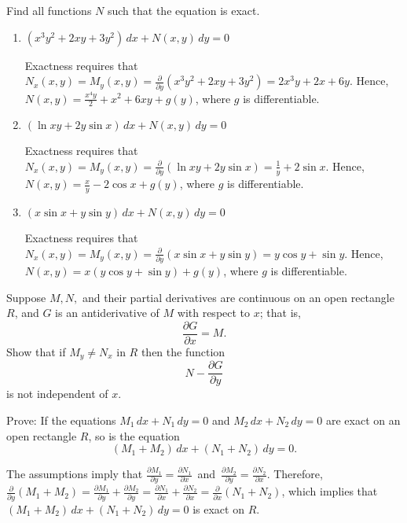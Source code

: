 \documentclass{ximera}
\begin{document}
\begin{problem}\label{exer:2.5.30}
Find all functions $N$ such that the  equation is exact.
\begin{enumerate}
\item %
$(x^3y^2+2xy+3y^2)\,dx+N(x,y)\,dy=0$



\begin{solution}
    Exactness requires that
$N_x(x,y)=M_y(x,y)=\frac{\partial}{\partial
y}(x^3y^2+2xy+3y^2)=2x^3y+2x+6y$.
 Hence, $N(x,y)=\frac{x^4y}{2}+x^2+6xy+g(y)$,
where $g$ is  differentiable.
\end{solution}

\item %
$(\ln xy+2y\sin x)\,dx+N(x,y)\,dy=0$



\begin{solution}
    Exactness requires that
$N_x(x,y)=M_y(x,y)=\frac{\partial}{\partial y}(\ln xy+2y\sin
x)=\frac{1}{y}+2\sin x$.
 Hence, $N(x,y)=\frac{x}{y}-2\cos x+g(y)$,
where $g$ is  differentiable.
\end{solution}
\item %
$(x\sin x+y\sin y)\,dx+N(x,y)\,dy=0$



\begin{solution}
    Exactness requires that
$N_x(x,y)=M_y(x,y)=\frac{\partial}{\partial y}(x\sin x+y\sin
y)=y\cos y+\sin y$.
 Hence, $N(x,y)=x(y\cos y+\sin y)+g(y)$,
where $g$ is  differentiable.
\end{solution}
\end{enumerate}


\end{problem}

\begin{problem}\label{exer:2.5.31}
Suppose $M,N,$ and their partial derivatives are continuous on
an open rectangle $R$, and $G$ is an antiderivative of $M$ with respect to $x$; that is,
$$
\frac{\partial G}{\partial x}=M.
$$
Show that if $M_y\ne N_x$ in $R$ then the function
$$
 N-\frac{\partial  G}{\partial y}
$$
is not independent of $x$.
\end{problem}

\begin{problem}\label{exer:2.5.32}
Prove:  If the equations $M_1\,dx+N_1\,dy=0$ and $M_2\,
dx+N_2\,dy=0$ are exact on an open rectangle $R$,  so is
the equation $$(M_1+M_2)\,dx+(N_1+N_2)\,dy=0.$$



\begin{solution}
The assumptions imply that
$\frac{\partial M_1}{\partial y}=\frac{\partial N_1}{\partial x}$\
and\ $\frac{\partial M_2}{\partial y}=\frac{\partial N_2}{\partial
x}$. Therefore, $\frac{\partial }{\partial
y}(M_1+M_2)=\frac{\partial M_1}{\partial y}+\frac{\partial
M_2}{\partial y}=\frac{\partial N_1}{\partial x}+\frac{\partial
N_2}{\partial x}=\frac{\partial }{\partial x}(N_1+N_2)$,
which implies that $(M_1+M_2)\,dx+(N_1+N_2)\,dy=0$ is exact on $R$.
\end{solution}
\end{problem}
\end{document}
